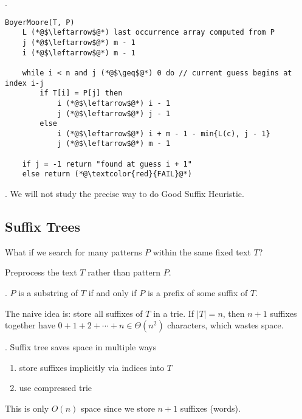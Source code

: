 \documentclass{article}
\begin{document}
\begin{codes}[].
    \begin{lstlisting}[style=cppstyle]
    BoyerMoore(T, P)
    L (*@$\leftarrow$@*) last occurrence array computed from P
    j (*@$\leftarrow$@*) m - 1
    i (*@$\leftarrow$@*) m - 1

    while i < n and j (*@$\geq$@*) 0 do // current guess begins at index i-j
        if T[i] = P[j] then
            i (*@$\leftarrow$@*) i - 1
            j (*@$\leftarrow$@*) j - 1
        else
            i (*@$\leftarrow$@*) i + m - 1 - min{L(c), j - 1}
            j (*@$\leftarrow$@*) m - 1

    if j = -1 return "found at guess i + 1" 
    else return (*@\textcolor{red}{FAIL}@*)
    \end{lstlisting}
\end{codes}

\begin{comm}[].
    We will not study the precise way to do Good Suffix Heuristic. 
\end{comm}

\subsection{Suffix Trees}

\begin{Question}{}
    What if we search for many patterns $P$ within the same fixed text $T$?
\end{Question}

\begin{solution}
    Preprocess the text $T$ rather than pattern $P$. 
\end{solution}

\begin{discovery}[].
    $P$ is a substring of $T$ if and only if $P$ is a prefix of some suffix of $T$. 
\end{discovery}

The naive idea is: store all suffixes of $T$ in a trie. If $|T| = n$, then $n + 1$ suffixes together have $0 + 1 + 2 + \cdots + n \in \Theta(n^2)$ characters, which wastes space. 

\begin{deff}.
    Suffix tree saves space in multiple ways \begin{enumerate}
        \item store suffixes implicitly via indices into $T$ 
        \item use compressed trie 
    \end{enumerate} 
    This is only $O(n)$ space since we store $n + 1$ suffixes (words). 
\end{deff}
\end{document}
